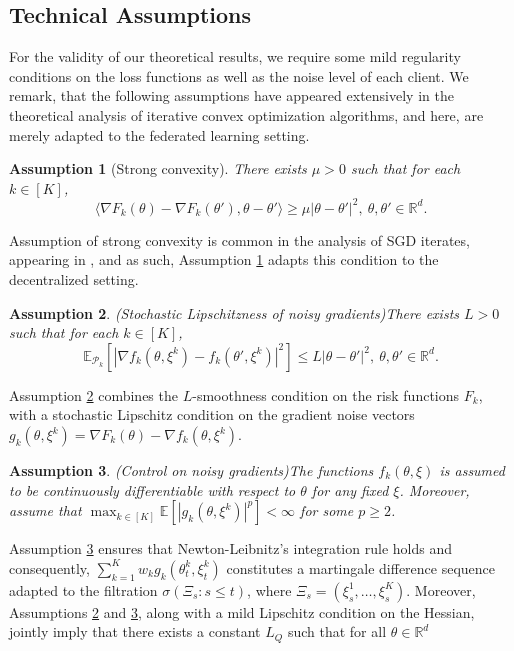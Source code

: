\documentclass[a4paper,11pt]{article}
\numberwithin{equation}{section}
\theoremstyle{plain}
\newtheorem{assumption}{Assumption}[section]
\theoremstyle{remark}
\def\IE{\mathbb{E}}
\def\R{\mathbb{R}}
\begin{document}
\subsection{Technical Assumptions}
For the validity of our theoretical results, we require some mild regularity conditions on the loss functions as well as the noise level of each client. We remark, that the following assumptions have appeared extensively in the theoretical analysis of iterative convex optimization algorithms, and here, are merely adapted to the federated learning setting. 
\begin{assumption}[Strong convexity]\label{ass:sc}
    There exists $\mu>0$ such that for each $k\in [K]$, 
    \[ \langle\nabla F_k(\theta) - \nabla F_k(\theta'), \theta-\theta'\rangle \geq \mu |\theta-\theta'|^2, \ \theta, \theta' \in \R^d. \]
\end{assumption}
Assumption of strong convexity is common in the analysis of SGD iterates, appearing in \cite{ruppert1988efficient, polyak1992acceleration, bottou-nocedal, chen2020statistical}, and as such, Assumption \ref{ass:sc} adapts this condition to the decentralized setting. 
\begin{assumption}(Stochastic Lipschitzness of noisy gradients)\label{ass:Lipschitz}
    There exists $L>0$ such that for each $k \in [K]$,
    \[ \IE_{\mathcal{P}_k}[|\nabla f_k(\theta, \xi^k)- f_k(\theta', \xi^k)|^2] \leq L|\theta - \theta'|^2, \ \theta, \theta' \in \R^d.\]
\end{assumption}
Assumption \ref{ass:Lipschitz} combines the $L$-smoothness condition  on the risk functions $F_k$, with a stochastic Lipschitz condition on the gradient noise vectors $g_k(\theta, \xi^k)=\nabla F_k(\theta) - \nabla f_k(\theta, \xi^k)$. 
\begin{assumption}(Control on noisy gradients)\label{ass:boundedloss}
The functions $f_k(\theta, \xi)$ is assumed to be continuously differentiable with respect to $\theta$ for any fixed $\xi$. Moreover, assume that $\max_{k\in [K]}\IE[|g_k(\theta, \xi^k)|^p]< \infty$ for some $p \geq 2$.
\end{assumption}
Assumption \ref{ass:boundedloss} ensures that Newton-Leibnitz's integration rule holds and consequently, $\sum_{k=1}^K w_kg_k(\theta_t^k, \xi_t^k)$ constitutes a martingale difference sequence adapted to the filtration $\sigma(\Xi_s: s\leq t)$, where $\Xi_s=(\xi_s^1, \ldots, \xi_s^K)$. Moreover, Assumptions \ref{ass:Lipschitz} and \ref{ass:boundedloss}, along with a mild Lipschitz condition on the Hessian, jointly imply that there exists a constant $L_Q$ such that for all $\theta\in \R^d$
\end{document}
